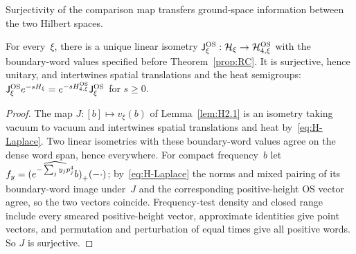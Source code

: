 Surjectivity of the comparison map transfers ground-space information between the two Hilbert spaces.
\begin{lemma}[OS comparison]\label{lem:H2.2}
For every~$\xi$, there is a unique linear isometry $\mathsf J_\xi^{\rm OS}:\mathcal H_\xi\to\mathcal H_{4,\xi}^{\rm OS}$ with the boundary-word values specified before Theorem~\ref{prop:RC}. It is surjective, hence unitary, and intertwines spatial translations and the heat semigroups: $\mathsf J_\xi^{\rm OS}e^{-sH_\xi}=e^{-sH_{4,\xi}^{\rm OS}}\mathsf J_\xi^{\rm OS}$ for $s\ge0$.
\end{lemma}
\begin{proof}
The map $J:[b]\mapsto v_\xi(b)$ of Lemma~\ref{lem:H2.1} is an isometry taking vacuum to vacuum and intertwines spatial translations and heat by~\eqref{eq:H-Laplace}. Two linear isometries with these boundary-word values agree on the dense word span, hence everywhere. For compact frequency~$b$ let $f_y=\widehat{(e^{-\sum_jy_jp_j^4}b)}_{+}(-\cdot)$; by~\eqref{eq:H-Laplace} the norms and mixed pairing of its boundary-word image under~$J$ and the corresponding positive-height OS vector agree, so the two vectors coincide. Frequency-test density and closed range include every smeared positive-height vector, approximate identities give point vectors, and permutation and perturbation of equal times give all positive words. So $J$ is surjective.
\end{proof}

